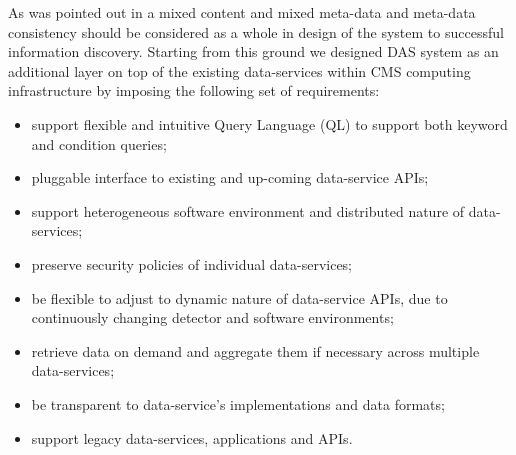 \documentclass[a4paper]{jpconf}
\begin{document}
As was pointed out in \cite{Arms} a mixed content and 
mixed meta-data and meta-data consistency should be considered as a whole in design 
of the system to successful information discovery. 
Starting from this ground we designed DAS system as an
additional layer on top of the existing data-services
within CMS computing infrastructure by imposing the following set of requirements:
\begin{itemize}
\item support flexible and intuitive Query Language (QL) to support
both keyword and condition queries;
\item pluggable interface to existing and up-coming data-service APIs;
\item support heterogeneous software environment and distributed nature of data-services;
\item preserve security policies of individual data-services;
\item be flexible to adjust to dynamic nature of data-service APIs, 
due to continuously changing detector and software environments;
\item retrieve data on demand and aggregate them if necessary across
multiple data-services;
\item be transparent to data-service's implementations and data formats;
\item support legacy data-services, applications and APIs.
\end{itemize}
\end{document}
